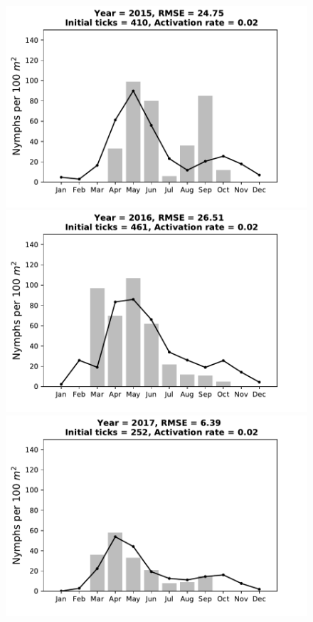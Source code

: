 \documentclass[a4paper, 11pt]{scrartcl}
\begin{document}
\begin{figure}[h!]
\begin{minipage}[c]{0.40\linewidth}
\end{minipage}
\begin{minipage}[c]{0.40\linewidth}
\includegraphics[width=\linewidth]{figures/s1/s1_2015}
\end{minipage}
\begin{minipage}[c]{0.40\linewidth}
\includegraphics[width=\linewidth]{figures/s1/s1_2016}
\end{minipage}
\begin{minipage}[c]{0.40\linewidth}
\includegraphics[width=\linewidth]{figures/s1/s1_2017}

\end{minipage}
\end{figure}
\end{document}
